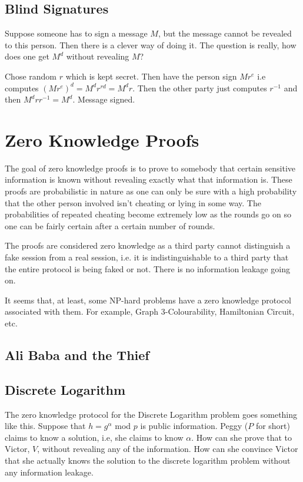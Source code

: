 \documentclass[12pt,a4paper]{article}
\begin{document}
\subsection{Blind Signatures}
Suppose someone has to sign a message $M$, but the message cannot be revealed to this person. Then there is a clever way of doing it. The question is really, how does one get $M^{d}$ without revealing $M$? 

Chose random $r$ which is kept secret. Then have the person sign $Mr^{e}$ i.e computes $(Mr^{e})^{d} = M^{d}r^{rd} = M^{d}r$. Then the other party just computes $r^{-1}$ and then $M^{d}rr^{-1} = M^{d}$. Message signed. 


\section{Zero Knowledge Proofs}
The goal of zero knowledge proofs is to prove to somebody that certain sensitive information is known without revealing exactly what that information is. These proofs are probabilistic in nature as one can only be sure with a high probability that the other person involved isn't cheating or lying in some way. The probabilities of repeated cheating become extremely low as the rounds go on so one can be fairly certain after a certain number of rounds. 

The proofs are considered zero knowledge as a third party cannot distinguish a fake session from a real session, i.e. it is indistinguishable to a third party that the entire protocol is being faked or not. There is no information leakage going on. 

It seems that, at least, some NP-hard problems have a zero knowledge protocol associated with them. For example, Graph 3-Colourability, Hamiltonian Circuit, etc. 

\subsection{Ali Baba and the Thief}
\subsection{Discrete Logarithm}
The zero knowledge protocol for the Discrete Logarithm problem goes something like this. Suppose that $h = g^{\alpha}$ mod $p$ is public information. Peggy ($P$ for short) claims to know a solution, i.e, she claims to know $\alpha$. How can she prove that to Victor, $V$, without revealing any of the information. How can she convince Victor that she actually knows the solution to the discrete logarithm problem without any information leakage. 
\end{document}
